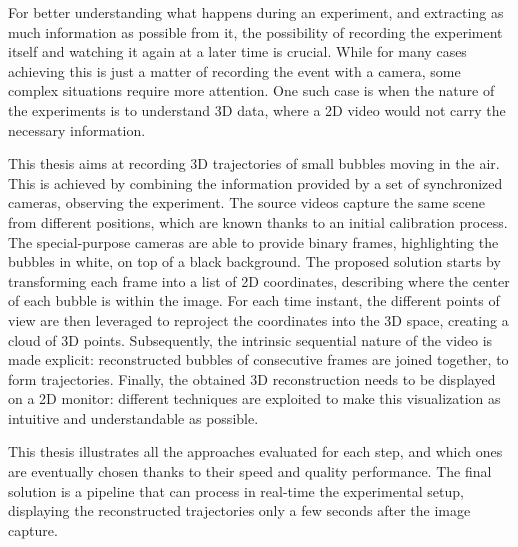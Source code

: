 
For better understanding what happens during an experiment, and extracting as much information as possible from it, the possibility of recording the experiment itself and watching it again at a later time is crucial.
While for many cases achieving this is just a matter of recording the event with a camera, some complex situations require more attention.
One such case is when the nature of the experiments is to understand 3D data, where a 2D video would not carry the necessary information.

This thesis aims at recording 3D trajectories of small bubbles moving in the air.
This is achieved by combining the information provided by a set of synchronized cameras, observing the experiment.
The source videos capture the same scene from different positions, which are known thanks to an initial calibration process.
The special-purpose cameras are able to provide binary frames, highlighting the bubbles in white, on top of a black background.
The proposed solution starts by transforming each frame into a list of 2D coordinates, describing where the center of each bubble is within the image.
For each time instant, the different points of view are then leveraged to reproject the coordinates into the 3D space, creating a cloud of 3D points.
Subsequently, the intrinsic sequential nature of the video is made explicit: reconstructed bubbles of consecutive frames are joined together, to form trajectories.
Finally, the obtained 3D reconstruction needs to be displayed on a 2D monitor: different techniques are exploited to make this visualization as intuitive and understandable as possible.

This thesis illustrates all the approaches evaluated for each step, and which ones are eventually chosen thanks to their speed and quality performance.
The final solution is a pipeline that can process in real-time the experimental setup, displaying the reconstructed trajectories only a few seconds after the image capture.
